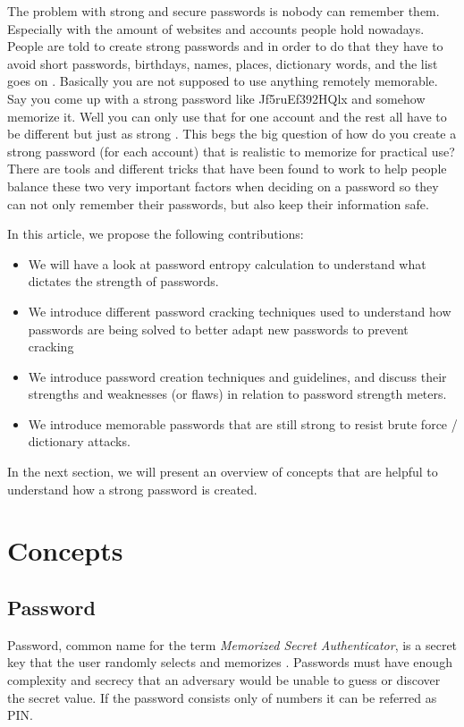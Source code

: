 \documentclass[acmsmall,nonacm]{acmart}
\begin{document}
The problem with strong and secure passwords is nobody can remember them. Especially with the amount of websites and accounts people hold nowadays. People are told to create strong passwords and in order to do that they have to avoid short passwords, birthdays, names, places, dictionary words, and the list goes on \cite{lee_2014}. Basically you are not supposed to use anything remotely memorable. Say you come up with a strong password like Jf5ruEf392HQlx and somehow memorize it. Well you can only use that for one account and the rest all have to be different but just as strong \cite{rubenking_2021}. This begs the big question of how do you create a strong password (for each account) that is realistic to memorize for practical use? There are tools and different tricks that have been found to work to help people balance these two very important factors when deciding on a password so they can not only remember their passwords, but also keep their information safe.

In this article, we propose the following contributions:

\begin{itemize}
\item We will have a look at password entropy calculation to understand what dictates the strength of passwords.
\item We introduce different password cracking techniques used to understand how passwords are being solved to better adapt new passwords to prevent cracking
\item We introduce password creation techniques and guidelines, and discuss their strengths and weaknesses (or flaws) in relation to password strength meters.
\item We introduce memorable passwords that are still strong to resist brute force / dictionary attacks.
\end{itemize}

In the next section, we will present an overview of concepts that are helpful to understand how a strong password is created.

\section{Concepts}

\subsection{Password} \label{password}

Password, common name for the term \emph{Memorized Secret Authenticator}, is a secret key that the user randomly selects and memorizes \cite{nist_2020}. Passwords must have enough complexity and secrecy that an adversary would be unable to guess or discover the secret value. If the password consists only of numbers it can be referred as PIN.
\end{document}
